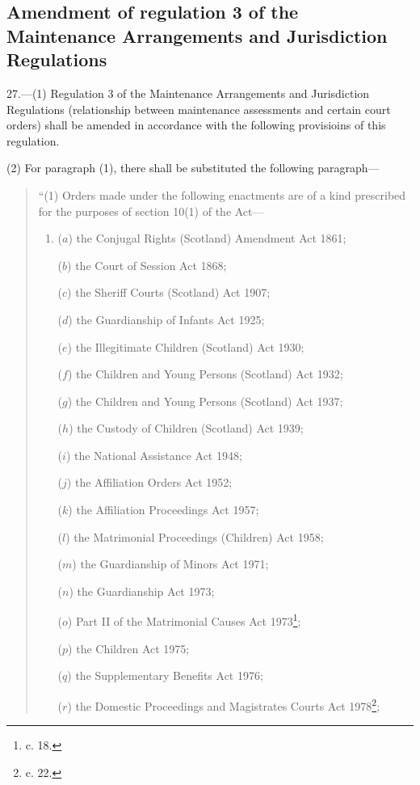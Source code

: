 \documentclass[a4paper]{article}
\begin{document}
\subsection[27. Amendment of regulation 3 of the Maintenance Arrangements and Jurisdiction Regulations]{Amendment of regulation 3 of the Maintenance Arrangements and Jurisdiction Regulations}

27.—(1) Regulation 3 of the Maintenance Arrangements and Jurisdiction Regulations (relationship between maintenance assessments and certain court orders) shall be amended in accordance with the following provisioins of this regulation.

(2) For paragraph (1), there shall be substituted the following paragraph—
\begin{quotation}
“(1) Orders made under the following enactments are of a kind prescribed for the purposes of section 10(1) of the Act—
\begin{enumerate}\item[]
($a$) the Conjugal Rights (Scotland) Amendment Act 1861;

($b$) the Court of Session Act 1868;

($c$) the Sheriff Courts (Scotland) Act 1907;

($d$) the Guardianship of Infants Act 1925;

($e$) the Illegitimate Children (Scotland) Act 1930;

($f$) the Children and Young Persons (Scotland) Act 1932;

($g$) the Children and Young Persons (Scotland) Act 1937;

($h$) the Custody of Children (Scotland) Act 1939;

($i$) the National Assistance Act 1948;

($j$) the Affiliation Orders Act 1952;

($k$) the Affiliation Proceedings Act 1957;

($l$) the Matrimonial Proceedings (Children) Act 1958;

($m$) the Guardianship of Minors Act 1971;

($n$) the Guardianship Act 1973;

($o$) Part II of the Matrimonial Causes Act 1973\footnote{ c. 18.};

($p$) the Children Act 1975;

($q$) the Supplementary Benefits Act 1976;

\begin{sloppypar}
($r$) the Domestic Proceedings and Magistrates Courts Act 1978\footnote{ c. 22.};
\end{sloppypar}


\end{enumerate}
\end{quotation}
\end{document}
